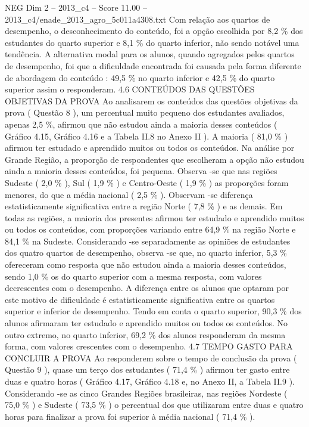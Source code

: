 \begin{textsample}{NEG Dim 2 – 2013\_c4 – Score 11.00 – 2013\_c4/enade\_2013\_agro\_5c011a4308.txt}
Com relação aos quartos de desempenho, o desconhecimento do conteúdo, foi a opção escolhida por 8,2 \% dos estudantes do quarto superior e 8,1 \% do quarto inferior, não sendo notável uma tendência.
A alternativa modal para os alunos, quando agregados pelos quartos de desempenho, foi que a dificuldade encontrada foi causada pela forma diferente de abordagem do conteúdo : 49,5 \% no quarto inferior e 42,5 \% do quarto superior assim o responderam. 4.6 CONTEÚDOS DAS QUESTÕES OBJETIVAS DA PROVA Ao analisarem os conteúdos das questões objetivas da prova ( Questão 8 ), um percentual muito pequeno dos estudantes avaliados, apenas 2,5 \%, afirmou que não estudou ainda a maioria desses conteúdos ( Gráfico 4.15, Gráfico 4.16 e a Tabela II.8 no Anexo II ).
A maioria ( 81,0 \% ) afirmou ter estudado e aprendido muitos ou todos os conteúdos.
Na análise por Grande Região, a proporção de respondentes que escolheram a opção não estudou ainda a maioria desses conteúdos, foi pequena.
Observa -se que nas regiões Sudeste ( 2,0 \% ), Sul ( 1,9 \% ) e Centro-Oeste ( 1,9 \% ) as proporções foram menores, do que a média nacional ( 2,5 \% ).
Observam -se diferença estatisticamente significativa entre a região Norte ( 7,8 \% ) e as demais.
Em todas as regiões, a maioria dos presentes afirmou ter estudado e aprendido muitos ou todos os conteúdos, com proporções variando entre 64,9 \% na região Norte e 84,1 \% na Sudeste.
Considerando -se separadamente as opiniões de estudantes dos quatro quartos de desempenho, observa -se que, no quarto inferior, 5,3 \% ofereceram como resposta que não estudou ainda a maioria desses conteúdos, sendo 1,0 \% os do quarto superior com a mesma resposta, com valores decrescentes com o desempenho.
A diferença entre os alunos que optaram por este motivo de dificuldade é estatisticamente significativa entre os quartos superior e inferior de desempenho.
Tendo em conta o quarto superior, 90,3 \% dos alunos afirmaram ter estudado e aprendido muitos ou todos os conteúdos.
No outro extremo, no quarto inferior, 69,2 \% dos alunos responderam da mesma forma, com valores crescentes com o desempenho. 4.7 TEMPO GASTO PARA CONCLUIR A PROVA Ao responderem sobre o tempo de conclusão da prova ( Questão 9 ), quase um terço dos estudantes ( 71,4 \% ) afirmou ter gasto entre duas e quatro horas ( Gráfico 4.17, Gráfico 4.18 e, no Anexo II, a Tabela II.9 ).
Considerando -se as cinco Grandes Regiões brasileiras, nas regiões Nordeste ( 75,0 \% ) e Sudeste ( 73,5 \% ) o percentual dos que utilizaram entre duas e quatro horas para finalizar a prova foi superior à média nacional ( 71,4 \% ).

\end{textsample}
